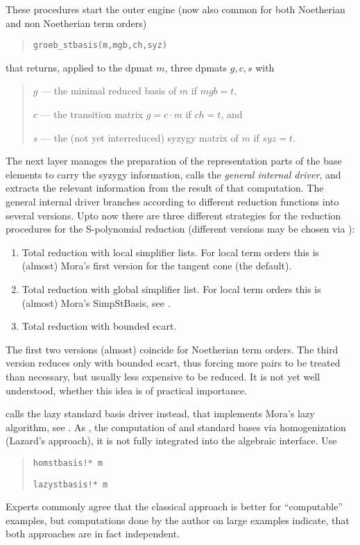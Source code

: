 These procedures start the outer \gr engine (now also common for both
Noetherian and non Noetherian term orders)
\begin{quote}
\verb|groeb_stbasis(m,mgb,ch,syz)|
\end{quote}
that returns, applied to the dpmat $m$, three dpmats $g,c,s$ with
\begin{quote}
$g$ --- the minimal reduced \gr basis of $m$ if $mgb=t$,

$c$ --- the transition matrix $g=c\cdot m$ if $ch=t$, and

$s$ --- the (not yet interreduced) syzygy matrix of $m$ if $syz=t$.
\end{quote}

The next layer manages the preparation of the representation parts
of the base elements to carry the syzygy information, calls the
{\em general internal driver}, and extracts the relevant information
from the result of that computation. The general internal driver
branches according to different reduction functions into several
versions. Upto now there are three different strategies for the
reduction procedures for the S-polynomial reduction (different
versions may be chosen via ): 
\begin{enumerate} 
\item Total reduction with local simplifier lists. For local term
orders this is (almost) Mora's first version for the tangent cone (the
default). 
        
\item Total reduction with global simplifier list. For local term
orders this is (almost) Mora's SimpStBasis, see \cite{MPT}.

\item Total reduction with bounded ecart. 
\end{enumerate} 
The first two versions (almost) coincide for Noetherian term
orders. The third version reduces only with bounded ecart, thus
forcing more pairs to be treated than necessary, but usually less
expensive to be reduced. It is not yet well understood, whether this
idea is of practical importance. 

 calls the lazy standard basis driver instead,
that implements Mora's lazy algorithm, see \cite{MPT}. As
, the computation of \gr and standard bases via
homogenization (Lazard's approach), it is not fully integrated into
the algebraic interface. Use
\begin{quote}
\verb|homstbasis!* m|


\verb|lazystbasis!* m|

\end{quote}
Experts commonly agree that the classical approach is better for
``computable'' examples, but computations done by the author
on large examples indicate, that both approaches are in fact
independent. 
\medskip

